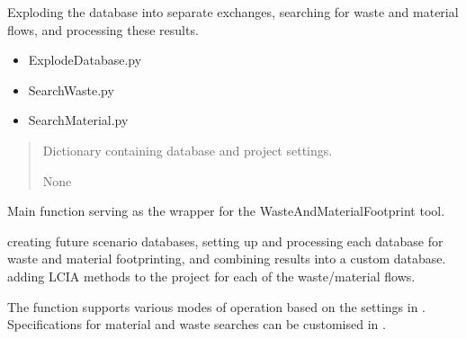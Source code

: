 \documentclass[letterpaper,10pt,english]{sphinxmanual}
\begin{document}
\begin{fulllineitems}
\label{\detokenize{WasteAndMaterialFootprint:WasteAndMaterialFootprint.main.ExplodeAndSearch}}
\pysigstartsignatures
{}
\pysigstopsignatures
\sphinxAtStartPar
Exploding the database into separate exchanges, searching for waste and
material flows, and processing these results.
\begin{description}
\begin{itemize}
\item {} 
\sphinxAtStartPar
ExplodeDatabase.py

\item {} 
\sphinxAtStartPar
SearchWaste.py

\item {} 
\sphinxAtStartPar
SearchMaterial.py

\end{itemize}

\end{description}
\begin{quote}\begin{description}
\sphinxAtStartPar
{} \textendash{} Dictionary containing database and project settings.

\sphinxAtStartPar
None

\end{description}\end{quote}

\end{fulllineitems}


\begin{fulllineitems}
\label{\detokenize{WasteAndMaterialFootprint:WasteAndMaterialFootprint.main.run}}
\pysigstartsignatures
{}
\pysigstopsignatures
\sphinxAtStartPar
Main function serving as the wrapper for the WasteAndMaterialFootprint tool.
\begin{description}
\sphinxAtStartPar
creating future scenario databases,
setting up and processing each database for waste and material footprinting,
and combining results into a custom database.
adding LCIA methods to the project for each of the waste/material flows.

\end{description}

\sphinxAtStartPar
The function supports various modes of operation based on the settings in .
Specifications for material and waste searches can be customised in .

\end{fulllineitems}
\end{document}
